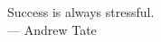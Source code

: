 \cleardoublepage
{}
\thispagestyle{empty}

\vspace*{3cm}

\begin{center}
    Success is always stressful. \\ \medskip
    --- Andrew Tate
\end{center}

\medskip

